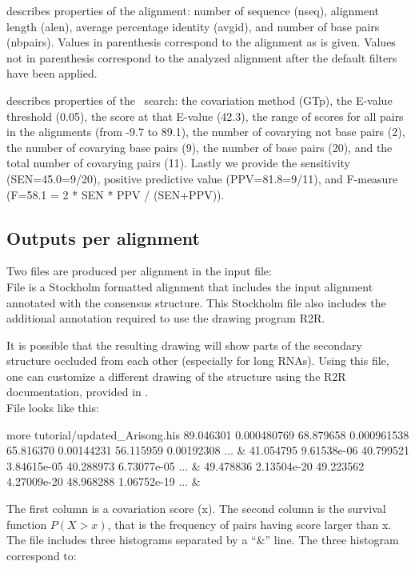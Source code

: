 \begin{sreitems}{}
\item[\prog{First comment line}]describes properties of the
  alignment: number of sequence (nseq), alignment length (alen),
  average percentage identity (avgid), and number of base pairs
  (nbpairs).  Values in parenthesis correspond to the alignment as is
  given. Values not in parenthesis correspond to the analyzed
  alignment after the default filters have been applied.

\item[\prog{Second comment line}]describes properties of the
  \rscape\ search: the covariation method (GTp), the E-value threshold
  (0.05), the score at that E-value (42.3), the range of scores for all
  pairs in the alignments (from -9.7 to 89.1), the number of covarying
  not base pairs (2), the number of covarying base pairs (9), the
  number of base pairs (20), and the total number of covarying pairs
  (11). Lastly we provide the sensitivity (SEN=45.0=9/20), positive
  predictive value (PPV=81.8=9/11), and F-measure (F=58.1 = 2 * SEN *
  PPV / (SEN+PPV)).
\end{sreitems}


\subsection{Outputs per alignment}
Two files are produced per alignment in the input file: \\

File  is a Stockholm
formatted alignment that includes the input alignment annotated with
the consensus structure. This Stockholm file also includes the
additional annotation required to use the drawing program R2R.

It is possible that the resulting drawing will show parts of the
secondary structure occluded from each other (especially for long
RNAs).  Using this file, one can customize a different drawing of the
structure using the R2R documentation, provided in
.\\

File  looks like this:
\begin{sreoutput}
more tutorial/updated_Arisong.his
89.046301       0.000480769
68.879658       0.000961538
65.816370       0.00144231
56.115959       0.00192308
...
&
41.054795       9.61538e-06
40.799521       3.84615e-05
40.288973       6.73077e-05
...
&
49.478836       2.13504e-20
49.223562       4.27009e-20
48.968288       1.06752e-19
...
&
\end{sreoutput}
The first column is a covariation score (x). The second column is the
survival function $P(X > x)$, that is the frequency of pairs having
score larger than x. The file includes three histograms separated by a
``\&'' line. The three histogram correspond to:

